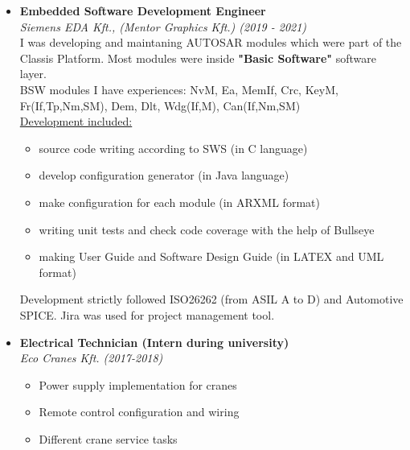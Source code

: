 \documentclass[11pt,oneslide,a4paper,titlepage]{article}
\begin{document}
\begin{tcolorbox}
\begin{minipage}[t]{11cm}
\begin{tcolorbox}[grow to right by=0.75cm,colframe=white,colback=white]
			\hfill\break
			\begin{itemize}
				\item{
					\textbf{Embedded Software Development Engineer} \\
					\emph{Siemens EDA Kft., (Mentor Graphics Kft.) (2019 - 2021)} \\
						\hfill\break
	   				    I was developing and maintaning AUTOSAR modules which were part of the Classis Platform. Most modules were inside \textbf{"Basic Software"} software layer. \\
						\hfill\break
	    				BSW modules I have experiences: NvM, Ea, MemIf, Crc, KeyM, Fr(If,Tp,Nm,SM), Dem, Dlt, Wdg(If,M), Can(If,Nm,SM) \\
						\hfill\break
						\underline{Development included:}
						\begin{itemize}
							\item{
								source code writing according to SWS (in C language)		
							}
							\item{
								develop configuration generator (in Java language)
							}
							\item{
								make configuration for each module (in ARXML format)
							}
							\item{
								writing unit tests and check code coverage with the help of Bullseye	
							}
							\item{
								making User Guide and Software Design Guide (in LATEX and UML format)			
							}
						\end{itemize}
		
				Development strictly followed ISO26262 (from ASIL A to D) and Automotive SPICE. Jira was used for project management tool.
				}
				\hfill\break
				\item{
					\textbf{Electrical Technician (Intern during university)} \\
					\emph{Eco Cranes Kft. (2017-2018)}
					\begin{itemize}
						\item{Power supply implementation for cranes}
						\item{Remote control configuration and wiring}
						\item{Different crane service tasks}
					\end{itemize}
				}
			\end{itemize}
			
		\end{tcolorbox}
	\end{minipage}
\end{tcolorbox}
\end{document}
